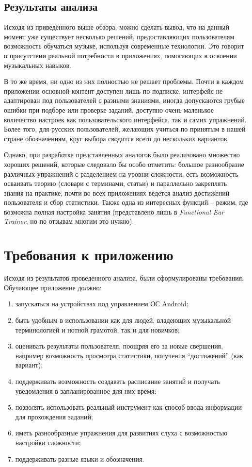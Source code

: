 \subsection{Результаты анализа}
Исходя из приведённого выше обзора, можно сделать вывод, что на данный момент уже существует несколько решений, предоставляющих пользователям возможность обучаться музыке, используя современные технологии. Это говорит о присутствии реальной потребности в приложениях, помогающих в освоении музыкальных навыков.\par
В то же время, ни одно из них полностью не решает проблемы. Почти в каждом приложении основной контент доступен лишь по подписке, интерфейс не адаптирован под пользователей с разными знаниями, иногда допускаются грубые ошибки при подборе или проверке заданий, доступно очень маленькое количество настроек как пользовательского интерфейса, так и самих упражнений. Более того, для русских пользователей, желающих учиться по принятым в нашей стране обозначениям, круг выбора сводится всего до нескольких вариантов.\par
Однако, при разработке представленных аналогов было реализовано множество хороших решений, которые следовало бы особо отметить: большое разнообразие различных упражнений с разделением на уровни сложности, есть возможность осваивать теорию (словари с терминами, статьи) и параллельно закреплять знания на практике, почти во всех приложениях ведётся анализ достижений пользователя и сбор статистики. Также одна из интересных функций -- режим, где возможна полная настройка занятия (представлено лишь в \textit{Functional Ear Trainer}, но по отзывам многим это нужно).
\section{Требования к приложению}
Исходя из результатов проведённого анализа, были сформулированы требования. Обучающее приложение должно: 
\begin{enumerate}
\item запускаться на устройствах под управлением ОС Android;
\item быть удобным в использовании как для людей, владеющих музыкальной терминологией и нотной грамотой, так и для новичков;
\item оценивать результаты пользователя, поощряя его за новые свершения, например возможность просмотра статистики, получения “достижений” (как вариант);
\item поддерживать возможность создавать расписание занятий и получать уведомления в запланированное для них время;
\item позволять использовать реальный инструмент как способ ввода информации для прохождения заданий;
\item иметь разнообразные упражнения для развитиях слуха с возможностью настройки сложности;
\item поддерживать разные языки и обозначения.
\end{enumerate}\par
